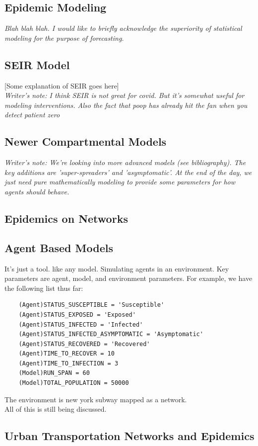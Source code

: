 \documentclass[12pt, a4, epsf] {article}
\theoremstyle{plain}
\theoremstyle{definition}
\begin{document}
\subsection*{Epidemic Modeling}
\textit{Blah blah blah. I would like to briefly acknowledge the superiority of statistical modeling for the purpose of forecasting.}
\subsection*{SEIR Model}
[Some explanation of SEIR goes here]\\
\textit{Writer's note: I think SEIR is not great for covid. But it's somewhat useful for modeling interventions. Also the fact that poop has already hit the fan when you detect patient zero}
\subsection*{Newer Compartmental Models}
\textit{Writer's note: We're looking into more advanced models (see bibliography). The key additions are 'super-spreaders' and 'asymptomatic'. At the end of the day, we just need pure mathematically modeling to provide some parameters for how agents should behave.} 
\subsection*{Epidemics on Networks}
\subsection*{Agent Based Models}
It's just a tool. like any model. Simulating agents in an environment. Key parameters are agent, model, and environment parameters. For example, we have the following list thus far:\\
\begin{verbatim}
	(Agent)STATUS_SUSCEPTIBLE = 'Susceptible'
	(Agent)STATUS_EXPOSED = 'Exposed'
	(Agent)STATUS_INFECTED = 'Infected'
	(Agent)STATUS_INFECTED_ASYMPTOMATIC = 'Asymptomatic'
	(Agent)STATUS_RECOVERED = 'Recovered'
	(Agent)TIME_TO_RECOVER = 10
	(Agent)TIME_TO_INFECTION = 3
	(Model)RUN_SPAN = 60
	(Model)TOTAL_POPULATION = 50000
\end{verbatim}
The environment is new york subway mapped as a network.\\ 
All of this is still being discussed.\\
\subsection*{Urban Transportation Networks and Epidemics}
\end{document}
